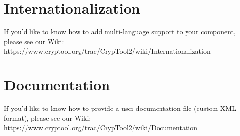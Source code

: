 \chapter{Internationalization}
\label{sec:Internationalization}

If you'd like to know how to add multi-language support to your component, please see our Wiki:
\url {https://www.cryptool.org/trac/CrypTool2/wiki/Internationalization}

\chapter{Documentation}
\label{sec:Documentation}

If you'd like to know how to provide a user documentation file (custom XML format), please see our Wiki:
\url{https://www.cryptool.org/trac/CrypTool2/wiki/Documentation}
